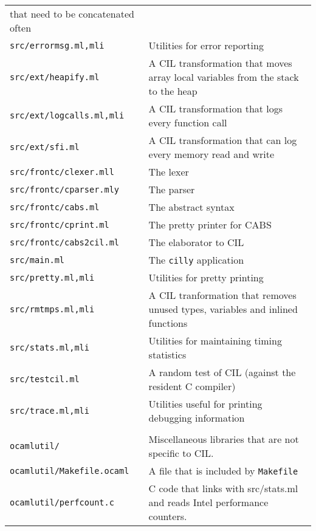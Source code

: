 \documentclass{article}
\def\t#1{{\tt #1}}
\begin{document}
\begin{tabular}{ll}
                                   that need to be concatenated often\\
\t{src/errormsg.ml,mli}         & Utilities for error reporting \\
\t{src/ext/heapify.ml}          & A CIL transformation that moves array local
                                   variables from the stack to the heap \\
\t{src/ext/logcalls.ml,mli}     & A CIL transformation that logs every
                                   function call \\
\t{src/ext/sfi.ml}              & A CIL transformation that can log every
                                   memory read and write \\
\t{src/frontc/clexer.mll}       & The lexer \\
\t{src/frontc/cparser.mly}      & The parser \\
\t{src/frontc/cabs.ml}          & The abstract syntax \\
\t{src/frontc/cprint.ml}        & The pretty printer for CABS \\
\t{src/frontc/cabs2cil.ml}      & The elaborator to CIL \\
\t{src/main.ml}                 & The \t{cilly} application \\
\t{src/pretty.ml,mli}           & Utilities for pretty printing \\
\t{src/rmtmps.ml,mli}           & A CIL tranformation that removes unused
                                  types, variables and inlined functions \\
\t{src/stats.ml,mli}            & Utilities for maintaining timing statistics
\\
\t{src/testcil.ml}              & A random test of CIL (against the resident 
                                  C compiler)\\
\t{src/trace.ml,mli}            & Utilities useful for printing debugging
                                   information\\
\\
\t{ocamlutil/}                  & Miscellaneous libraries that are not
                                  specific to CIL. \\
\t{ocamlutil/Makefile.ocaml}    & A file that is included by \t{Makefile} \\
\t{ocamlutil/perfcount.c}       & C code that links with src/stats.ml
                                  and reads Intel performance
                                  counters. \\

\end{tabular}
\end{document}
